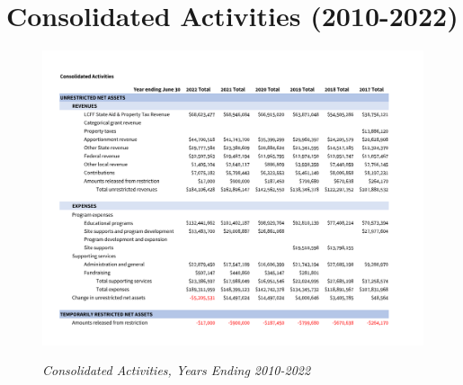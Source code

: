 
\chapter{Consolidated Activities (2010-2022)}\label{ch:consolidated_activities_2010-22}

  \begin{figure}
    \caption[Consolidated Activities, Years Ending 2010–2022]{\textit{Consolidated Activities, Years Ending 2010-2022}}\label{fig:consolidated_activities_2010-2022-4} %
    \includegraphics[width=0.9\textheight]{Consolidated_Financial_Statements/Consolidated_Activities_Years_2010-2022.pdf}\\ %
  \end{figure}



